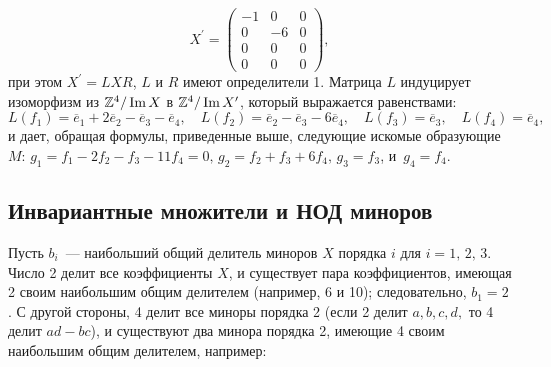 \documentclass{../../template/mai_book}
\begin{document}
    \[ X^\prime = \begin{pmatrix}
    -1 & 0 & 0\\
    0 & -6 & 0\\
    0 & 0 & 0\\
    0 & 0 & 0
    \end{pmatrix},
    \] при этом $X^\prime = LXR$, $L$ и $R$ имеют определители 1. Матрица $L$ индуцирует изоморфизм из $\mathbb{Z}^4/\operatorname{Im}{X}$ в $\mathbb{Z}^4/\operatorname{Im}{X}^\prime$, который выражается равенствами:
    $$ L(f_1) = \overline{e}_1 + 2\overline{e}_2-\overline{e}_3-\overline{e}_4,\quad L(f_2) = \overline{e}_2-\overline{e}_3-6\overline{e}_4,\quad L(f_3) = \overline{e}_3,\quad L(f_4) = \overline{e}_4,$$
    и дает, обращая формулы, приведенные выше, следующие искомые образующие $M$: $g_1 = f_1 - 2f_2 - f_3 - 11f_4 = 0,\,g_2 = f_2 + f_3 + 6f_4,\,g_3 = f_3$, и $\,g_4 = f_4$.

    \subsection{\normalsize{Инвариантные множители и НОД миноров}}

    Пусть $b_i$~— наибольший общий делитель миноров $X$ порядка $i$ для \linebreak $i = 1,\,2,\,3$.
    Число 2 делит все коэффициенты $X$, и существует пара коэффициентов, имеющая 2 своим наибольшим общим делителем (например, 6 и 10); следовательно, $b_1 = 2$. С другой стороны, 4 делит все миноры порядка 2 (если 2 делит $a, b, c, d,$ то 4 делит $ad - bc$), и существуют два минора порядка 2, имеющие 4 своим наибольшим общим делителем, например:
\end{document}

